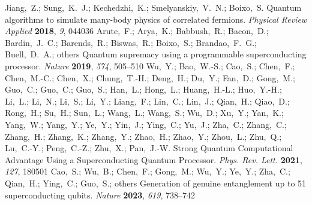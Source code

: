 \documentclass[journal=jctcce,a4paper,manuscript=article]{achemso}
\begin{document}
\begin{mcitethebibliography}{41}
  \mciteBstWouldAddEndPuncttrue
  \mciteSetBstMidEndSepPunct{\mcitedefaultmidpunct}
  {\mcitedefaultendpunct}{\mcitedefaultseppunct}\relax
  \EndOfBibitem
  Jiang,~Z.; Sung,~K.~J.; Kechedzhi,~K.; Smelyanskiy,~V.~N.; Boixo,~S. Quantum algorithms to simulate many-body physics of correlated fermions. \emph{Physical Review Applied} \textbf{2018}, \emph{9}, 044036\relax
  \mciteBstWouldAddEndPuncttrue
  \mciteSetBstMidEndSepPunct{\mcitedefaultmidpunct}
  {\mcitedefaultendpunct}{\mcitedefaultseppunct}\relax
  \EndOfBibitem
  Arute,~F.; Arya,~K.; Babbush,~R.; Bacon,~D.; Bardin,~J.~C.; Barends,~R.; Biswas,~R.; Boixo,~S.; Brandao,~F.~G.; Buell,~D.~A.; others Quantum supremacy using a programmable superconducting processor. \emph{Nature} \textbf{2019}, \emph{574}, 505--510\relax
  \mciteBstWouldAddEndPuncttrue
  \mciteSetBstMidEndSepPunct{\mcitedefaultmidpunct}
  {\mcitedefaultendpunct}{\mcitedefaultseppunct}\relax
  \EndOfBibitem
  Wu,~Y.; Bao,~W.-S.; Cao,~S.; Chen,~F.; Chen,~M.-C.; Chen,~X.; Chung,~T.-H.; Deng,~H.; Du,~Y.; Fan,~D.; Gong,~M.; Guo,~C.; Guo,~C.; Guo,~S.; Han,~L.; Hong,~L.; Huang,~H.-L.; Huo,~Y.-H.; Li,~L.; Li,~N.; Li,~S.; Li,~Y.; Liang,~F.; Lin,~C.; Lin,~J.; Qian,~H.; Qiao,~D.; Rong,~H.; Su,~H.; Sun,~L.; Wang,~L.; Wang,~S.; Wu,~D.; Xu,~Y.; Yan,~K.; Yang,~W.; Yang,~Y.; Ye,~Y.; Yin,~J.; Ying,~C.; Yu,~J.; Zha,~C.; Zhang,~C.; Zhang,~H.; Zhang,~K.; Zhang,~Y.; Zhao,~H.; Zhao,~Y.; Zhou,~L.; Zhu,~Q.; Lu,~C.-Y.; Peng,~C.-Z.; Zhu,~X.; Pan,~J.-W. Strong Quantum Computational Advantage Using a Superconducting Quantum Processor. \emph{Phys. Rev. Lett.} \textbf{2021}, \emph{127}, 180501\relax
  \mciteBstWouldAddEndPuncttrue
  \mciteSetBstMidEndSepPunct{\mcitedefaultmidpunct}
  {\mcitedefaultendpunct}{\mcitedefaultseppunct}\relax
  \EndOfBibitem
  Cao,~S.; Wu,~B.; Chen,~F.; Gong,~M.; Wu,~Y.; Ye,~Y.; Zha,~C.; Qian,~H.; Ying,~C.; Guo,~S.; others Generation of genuine entanglement up to 51 superconducting qubits. \emph{Nature} \textbf{2023}, \emph{619}, 738--742\relax

\end{mcitethebibliography}
\end{document}
